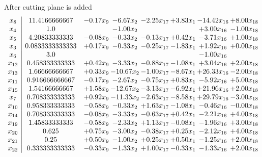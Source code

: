 \documentclass[8pt]{article}
\begin{document}
 After cutting plane is added 
\[\begin{array}{c| c c@{\hskip 2pt} c@{\hskip 2pt} c@{\hskip 2pt} c@{\hskip 2pt} c@{\hskip 2pt} c@{\hskip 2pt} }
 x_{8}   &  11.4166666667 & -0.17 x_{9} & -6.67 x_{2} & -2.25 x_{17} & +  3.83 x_{1} & -14.42 x_{16} & +  8.00 x_{18}\\
 x_{4}   &  1.0  &   & -1.00 x_{2} &    &   & +  3.00 x_{16} & -1.00 x_{18}\\
 x_{5}   &  4.20833333333 & -0.08 x_{9} & -0.33 x_{2} & -0.13 x_{17} & +  0.42 x_{1} & -3.71 x_{16} & +  1.00 x_{18}\\
 x_{3}   &  0.0833333333333 & +  0.17 x_{9} & -0.33 x_{2} & -0.25 x_{17} & -1.83 x_{1} & +  1.92 x_{16} & +  0.00 x_{18}\\
 x_{6}   &  3.0  &    &    &    &   & -1.00 x_{16} &   \\
 x_{12}   &  0.458333333333 & +  0.42 x_{9} & -3.33 x_{2} & -0.88 x_{17} & -1.08 x_{1} & +  3.04 x_{16} & +  2.00 x_{18}\\
 x_{13}   &  1.66666666667 & +  0.33 x_{9} & -10.67 x_{2} & -1.00 x_{17} & -8.67 x_{1} & + 26.33 x_{16} & -2.00 x_{18}\\
 x_{11}   &  0.916666666667 & -0.17 x_{9} & -2.67 x_{2} & -0.75 x_{17} & +  0.83 x_{1} & -5.92 x_{16} & +  5.00 x_{18}\\
 x_{15}   &  1.54166666667 & +  1.58 x_{9} & -12.67 x_{2} & -3.13 x_{17} & -6.92 x_{1} & + 21.96 x_{16} & +  2.00 x_{18}\\
 x_{7}   &  0.708333333333 & +  0.92 x_{9} & -11.33 x_{2} & -2.63 x_{17} & -8.58 x_{1} & + 29.79 x_{16} & -3.00 x_{18}\\
 x_{10}   &  0.958333333333 & -0.58 x_{9} & -0.33 x_{2} & +  1.63 x_{17} & -1.08 x_{1} & -0.46 x_{16} & -0.00 x_{18}\\
 x_{14}   &  0.708333333333 & -0.08 x_{9} & -3.33 x_{2} & -0.63 x_{17} & +  0.42 x_{1} & -2.21 x_{16} & +  4.00 x_{18}\\
 x_{19}   &  1.45833333333 & -0.58 x_{9} & -2.33 x_{2} & +  1.13 x_{17} & -0.08 x_{1} & -1.96 x_{16} & +  3.00 x_{18}\\
 x_{20}   &  0.625 & +  0.75 x_{9} & -3.00 x_{2} & -0.38 x_{17} & +  0.25 x_{1} & -2.12 x_{16} & +  4.00 x_{18}\\
 x_{21}   &  0.25 & +  0.50 x_{9} & -1.00 x_{2} & +  0.25 x_{17} & +  0.50 x_{1} & -1.25 x_{16} & +  2.00 x_{18}\\
 x_{22}   &  0.333333333333 & -0.33 x_{9} & -1.33 x_{2} & +  1.00 x_{17} & -0.33 x_{1} & -1.33 x_{16} & +  2.00 x_{18}\\

\end{array}\]
\end{document}
